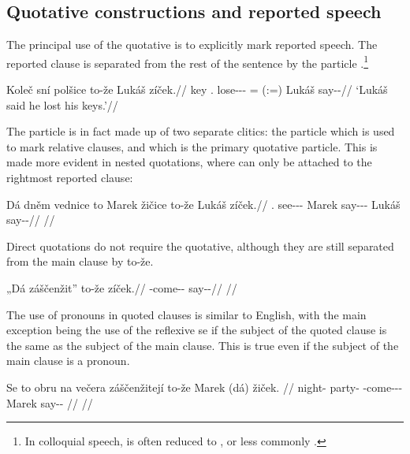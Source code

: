 \subsection{Quotative constructions and reported speech}\label{sec:quotative-const}

The principal use of the quotative is to explicitly mark reported speech. The reported clause is separated from the rest of the sentence by the particle .\footnote{In colloquial speech,  is often reduced to , or less commonly .}

\pex
  \begingl
    \gla Koleč sní polšice to-že Lukáš z\'iček.//
    \glb key \Refl{}.\Acc{} lose-\Av{}-\Pf{}-\Quot{} {\Rel{}=\Quot{} (:=\Qp{})} Lukáš say-\Av{}-\Pf{}//
    \glft ‘Lukáš said he lost his keys.’//
  \endgl
\xe

The particle  is in fact made up of two separate clitics: the particle  which is used to mark relative clauses, and  which is the primary quotative particle. This is made more evident in nested quotations, where  can only be attached to the rightmost reported clause:

\pex
  \begingl
    \gla Dá dněm vednice to Marek žičice to-že Lukáš z\'iček.//
    \glb \First{}\Sg{} \Dem{}.\Agt{} see-\Pv{}-\Pf{}-\Quot{} \Rel{} Marek say-\Av{}-\Pf{}-\Quot{} \Qp{} Lukáš say-\Av{}-\Pf{}//
    \glft {}//
  \endgl
\xe


Direct quotations do not require the quotative, although they are still separated from the main clause by to-že.

\pex
  \begingl
    \gla „Dá záščenžit” to-že z\'iček.//
    \glb \First{}\Sg{} \Neg{}-come-\Av{}-\SupP{} \Qp{} say-\Av{}-\Pf{}//
    \glft {}//
  \endgl
\xe



The use of pronouns in quoted clauses is similar to English, with the main exception being the use of the reflexive se if the subject of the quoted clause is the same as the subject of the main clause. This is true even if the subject of the main clause is a pronoun.

\pex
  \begingl
    \gla Se to obru na večera záščenžitej\'i to-že Marek (dá) žiček. //
    \glb \Refl{} \Dem{} night-\Ins{} \Loc{} party-\Acc{} \Neg{}-come-\Av{}-\SupP{}-\Quot{} \Qp{} Marek \First\Sg{} say-\Av{}-\Pf{} //
    \glft {}//
  \endgl
\xe

